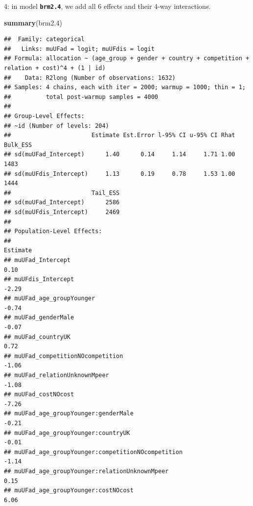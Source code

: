 \documentclass[
]{article}
\newenvironment{Shaded}{\begin{snugshade}}{\end{snugshade}}
\newcommand{\FloatTok}[1]{\textcolor[rgb]{0.00,0.00,0.81}{#1}}
\newcommand{\KeywordTok}[1]{\textcolor[rgb]{0.13,0.29,0.53}{\textbf{#1}}}
\newcommand{\NormalTok}[1]{#1}
\begin{document}
4: in model \textbf{\texttt{brm2.4}}, we add all 6 effects and their
4-way interactions.

\begin{Shaded}
\begin{Highlighting}[]
\KeywordTok{summary}\NormalTok{(brm2}\FloatTok{.4}\NormalTok{)}
\end{Highlighting}
\end{Shaded}

\begin{verbatim}
##  Family: categorical 
##   Links: muUFad = logit; muUFdis = logit 
## Formula: allocation ~ (age_group + gender + country + competition + relation + cost)^4 + (1 | id) 
##    Data: R2long (Number of observations: 1632) 
## Samples: 4 chains, each with iter = 2000; warmup = 1000; thin = 1;
##          total post-warmup samples = 4000
## 
## Group-Level Effects: 
## ~id (Number of levels: 204) 
##                       Estimate Est.Error l-95% CI u-95% CI Rhat Bulk_ESS
## sd(muUFad_Intercept)      1.40      0.14     1.14     1.71 1.00     1483
## sd(muUFdis_Intercept)     1.13      0.19     0.78     1.53 1.00     1444
##                       Tail_ESS
## sd(muUFad_Intercept)      2586
## sd(muUFdis_Intercept)     2469
## 
## Population-Level Effects: 
##                                                                                   Estimate
## muUFad_Intercept                                                                      0.10
## muUFdis_Intercept                                                                    -2.29
## muUFad_age_groupYounger                                                              -0.74
## muUFad_genderMale                                                                    -0.07
## muUFad_countryUK                                                                      0.72
## muUFad_competitionNOcompetition                                                      -1.06
## muUFad_relationUnknownMpeer                                                          -1.08
## muUFad_costNOcost                                                                    -7.26
## muUFad_age_groupYounger:genderMale                                                   -0.21
## muUFad_age_groupYounger:countryUK                                                    -0.01
## muUFad_age_groupYounger:competitionNOcompetition                                     -1.14
## muUFad_age_groupYounger:relationUnknownMpeer                                          0.15
## muUFad_age_groupYounger:costNOcost                                                    6.06

\end{verbatim}
\end{document}
